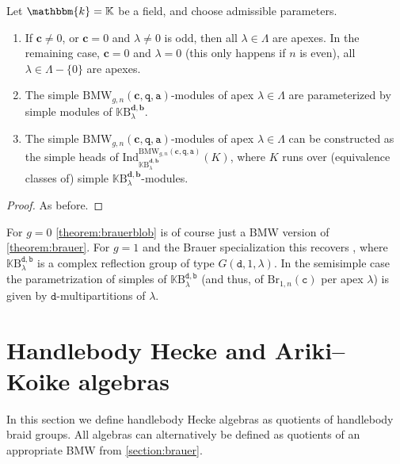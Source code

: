 \documentclass[a4paper,11pt]{amsart}
\newcommand{\setstuff}[1]{\mathrm{#1}}
\newcommand{\K}{\mathbb{K}}
\newcommand{\KK}{\mathbbm{k}}
\newcommand{\bsym}[1]{\boldsymbol{#1}}
\newcommand{\varsym}[1]{\mathtt{#1}}
\newcommand{\qvar}{\varsym{q}}
\newcommand{\cpar}{\bsym{c}}
\newcommand{\cvar}{\varsym{c}}
\newcommand{\bpar}{\bsym{b}}
\newcommand{\bvar}{\varsym{b}}
\newcommand{\dpar}{\bsym{d}}
\newcommand{\dvar}{\varsym{d}}
\newcommand{\avar}{\varsym{a}}
\numberwithin{equation}{section}
\let\fullref\autoref
\begin{document}
\begin{theorem}\label{theorem:brauerblob}
Let $\KK=\K$ be a field, and choose admissible parameters.
\begin{enumerate}

\item If $\cpar\neq 0$, or $\cpar=0$ and $\lambda\neq 0$ is odd, 
then all $\lambda\in\Lambda$ are apexes. In the remaining case, 
$\cpar=0$ and $\lambda=0$ (this only happens if $n$ is even), all $\lambda\in\Lambda-\{0\}$ are apexes.

\item The simple $\setstuff{BMW}_{g,n}(\cpar,\qvar,\avar)$-modules of 
apex $\lambda\in\Lambda$ 
are parameterized by simple modules of $\K\setstuff{B}_{\lambda}^{\dpar,\bpar}$.

\item The simple $\setstuff{BMW}_{g,n}(\cpar,\qvar,\avar)$-modules of 
apex $\lambda\in\Lambda$ can be constructed as 
the simple heads of
$\mathrm{Ind}_{\K\setstuff{B}_{\lambda}^{\dpar,\bpar}}^{\setstuff{BMW}_{g,n}(\cpar,\qvar,\avar)}(K)$, 
where $K$ runs over (equivalence classes of) 
simple $\K\setstuff{B}_{\lambda}^{\dpar,\bpar}$-modules.

\end{enumerate}
\end{theorem}

\begin{proof}
As before.
\end{proof}

\begin{example}
For $g=0$ \fullref{theorem:brauerblob} is 
of course just a BMW version of
\fullref{theorem:brauer}. For $g=1$ and the Brauer 
specialization this recovers 
\cite[Appendix 6]{BoCoDeVi-decomposition-cyclotomic-brauer}, where 
$\K\setstuff{B}_{\lambda}^{\dvar,\bvar}$ is a complex reflection 
group of type $G(\dvar,1,\lambda)$.
In the semisimple case the parametrization of simples of
$\K\setstuff{B}_{\lambda}^{\dvar,\bvar}$ (and thus, of $\setstuff{Br}_{1,n}(\cvar)$ per apex $\lambda$) is given 
by $\dvar$-multipartitions of $\lambda$. 
\end{example}

\section{Handlebody Hecke and Ariki--Koike algebras}\label{section:hecke}

In this section we define handlebody Hecke algebras as quotients of handlebody braid groups.  
All algebras can alternatively be defined as quotients of an appropriate
BMW from \fullref{section:brauer}. 
\end{document}
